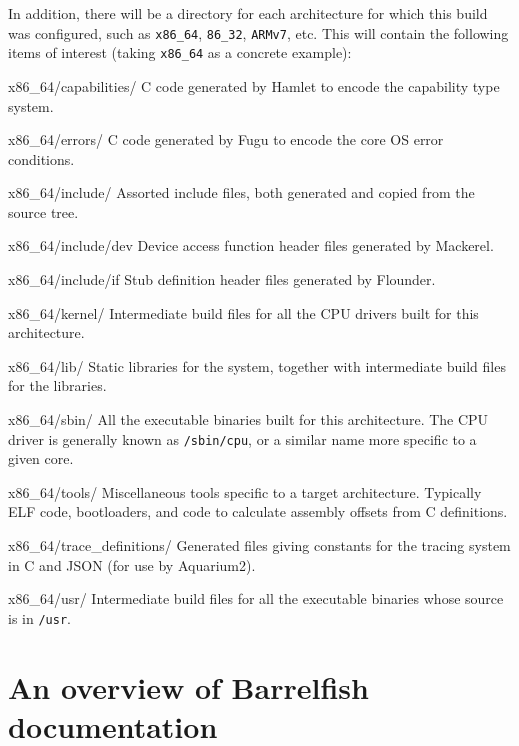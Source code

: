 \documentclass[a4paper,twoside]{report} %
\begin{document}
In addition, there will be a directory for each architecture for which
this build was configured, such as \texttt{x86\_64}, \texttt{86\_32},
\texttt{ARMv7}, etc.  This will contain the following items of
interest (taking \texttt{x86\_64} as a concrete example):

\begin{dirlist}
\item[x86\_64/capabilities/] C code generated by Hamlet to encode the
  capability type system. 
\item[x86\_64/errors/] C code generated by Fugu to encode the core OS
  error conditions. 
\item[x86\_64/include/] Assorted include files, both generated and
  copied from the source tree. 
\item[x86\_64/include/dev] Device access function header files
  generated by Mackerel.
\item[x86\_64/include/if] Stub definition header files
  generated by Flounder.
\item[x86\_64/kernel/] Intermediate build files for all the CPU
  drivers built for this architecture.
\item[x86\_64/lib/] Static libraries for the system, together with
  intermediate build files for the libraries.
\item[x86\_64/sbin/] All the executable binaries built for this
  architecture.  The CPU driver is generally known as
  \texttt{/sbin/cpu}, or a similar name more specific to a given
  core. 
\item[x86\_64/tools/] Miscellaneous tools specific to a target
  architecture.  Typically ELF code, bootloaders, and code to
  calculate assembly offsets from C definitions. 
\item[x86\_64/trace\_definitions/] Generated files giving constants
  for the tracing system in C and JSON (for use by Aquarium2). 
\item[x86\_64/usr/] Intermediate build files for all the executable
  binaries whose source is in \texttt{/usr}. 
\end{dirlist}






\chapter{An overview of Barrelfish documentation}\label{chap:docs}
\end{document}
